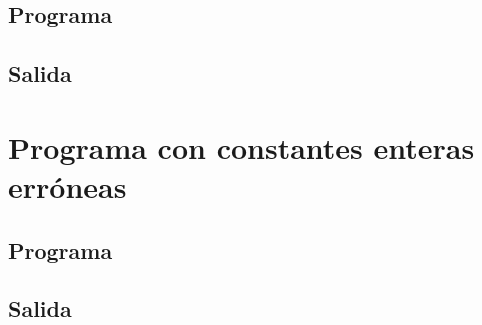     \subsection{Programa}
	    
        
	
   \subsection{Salida}
	    
        

    \hfill
    \clearpage




\section{Programa con constantes enteras erróneas}

    \subsection{Programa}
	    
        
	
   \subsection{Salida}
	    
        

    \hfill
    \clearpage
